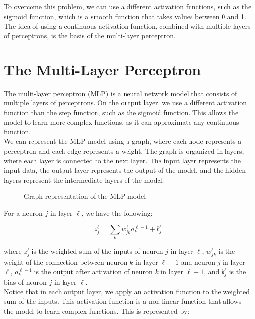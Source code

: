 To overcome this problem, we can use a different activation functions, such as the
sigmoid function, which is a smooth function that takes values between 0 and 1.
The idea of using a continuous activation function, combined with multiple layers
of perceptrons, is the basis of the multi-layer perceptron.


\section{The Multi-Layer Perceptron}

The multi-layer perceptron (MLP) is a neural network model that consists of multiple
layers of perceptrons. On the output layer, we use a different activation function
than the step function, such as the sigmoid function. This allows the model to learn
more complex functions, as it can approximate any continuous function.\\

We can represent the MLP model using a graph, where each node represents a perceptron
and each edge represents a weight. The graph is organized in layers, where each layer
is connected to the next layer. The input layer represents the input data, the output
layer represents the output of the model, and the hidden layers represent the intermediate
layers of the model.\\

\begin{figure}[H]
    \centering
    \caption{Graph representation of the MLP model}
    \label{fig:mlp_graph}
\end{figure}

For a neuron $j$ in layer $\ell$, we have the following:

\begin{equation}
    z_j^\ell = \sum_{k} w_{jk}^\ell a_k^{\ell-1} + b_j^\ell
\end{equation}

where $z_j^\ell$ is the weighted sum of the inputs of neuron $j$ in layer $\ell$,
$w_{jk}^\ell$ is the weight of the connection between neuron $k$ in layer $\ell-1$
and neuron $j$ in layer $\ell$, $a_k^{\ell-1}$ is the output after activation
of neuron $k$ in layer $\ell-1$, and $b_j^\ell$ is the bias of neuron $j$ in 
layer $\ell$.\\

Notice that in each output layer, we apply an activation function to the weighted sum
of the inputs. This activation function is a non-linear function that allows the model
to learn complex functions. This is represented by:

